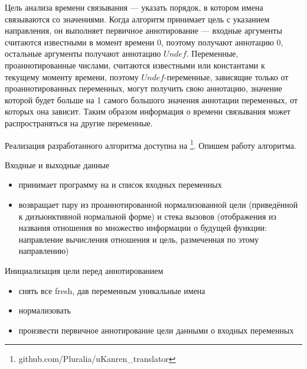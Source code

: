 \documentclass[conference,american,russian]{IEEEtran}
\begin{document}
Цель анализа времени связывания — указать порядок, в котором имена связываются со значениями. Когда алгоритм принимает цель с указанием направления, он выполняет первичное аннотирование --- входные аргументы считаются известными в момент времени 0, поэтому получают аннотацию 0, остальные аргументы получают аннотацию $Undef$. Переменные, проаннотированные числами, считаются известными или константами к текущему моменту времени, поэтому $Undef$-переменные, зависящие только от проаннотированных переменных, могут получить свою аннотацию, значение которой будет больше на 1 самого большого значения аннотации переменных, от которых она зависит. Таким образом информация о времени связывания может распространяться на другие переменные.

Реализация разработанного алгоритма доступна на \github{}\footnote{github.com/Pluralia/uKanren\_translator}. Опишем работу алгоритма.

Входные и выходные данные
\begin{itemize}
    \item принимает программу на \miniKanren{} и список входных переменных
    \item возвращает пару из проаннотированной нормализованной цели (приведённой к дизъюнктивной нормальной форме) и стека вызовов (отображения из названия отношения во множество информации о будущей функции: направление вычисления отношения и цель, размеченная по этому направлению)
\end{itemize}

Инициализация цели перед аннотированием
\begin{itemize}
    \item снять все fresh, дав переменным уникальные имена 
    \item нормализовать
    \item произвести первичное аннотирование цели данными о входных переменных
\end{itemize}
\end{document}
